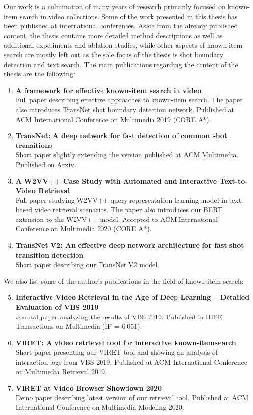 Our work is a culmination of many years of research primarily focused on known-item search in video collections. Some of the work presented in this thesis has been published at international conferences. Aside from the already published content, the thesis contains more detailed method descriptions as well as additional experiments and ablation studies, while other aspects of known-item search are mostly left out as the sole focus of the thesis is shot boundary detection and text search. The main publications regarding the content of the thesis are the following:
\begin{enumerate}
	\item \textbf{A framework for effective known-item search in video}~\cite{LokocMM2019}\\
	Full paper describing effective approaches to known-item search. The paper also introduces TransNet shot boundary detection network. Published at ACM International Conference on Multimedia 2019 (CORE A*).
	\item \textbf{TransNet: A deep network for fast detection of common shot transitions}~\cite{soucek2019transnet}\\
	Short paper slightly extending the version published at ACM Multimedia. Published on Arxiv.
	\item \textbf{A W2VV++ Case Study with Automated and Interactive Text-to-Video Retrieval}~\cite{W2VVppMM2020}\\
	Full paper studying W2VV++ query representation learning model \cite{XirongW2VVpp} in text-based video retrieval scenarios. The paper also introduces our BERT extension to the W2VV++ model. Accepted to ACM International Conference on Multimedia 2020 (CORE A*).
	\item \textbf{TransNet V2: An effective deep network architecture for fast shot transition detection}~\cite{soucek2020transnetv2}\\
	Short paper describing our TransNet V2 model.%
\end{enumerate}
We also list some of the author's publications in the field of known-item search:
\begin{enumerate}\setcounter{enumi}{4}
	\item \textbf{Interactive Video Retrieval in the Age of Deep Learning -- Detailed Evaluation of VBS 2019}~\cite{VBS2019_overview}\\
	Journal paper analyzing the results of VBS 2019. Published in IEEE Transactions on Multimedia (IF = 6.051).
	\item \textbf{VIRET: A video retrieval tool for interactive known-item\linebreak[4] search}~\cite{LokocICMR2019}\\
	Short paper presenting our VIRET tool and showing an analysis of interaction logs from VBS 2019. Published at ACM International Conference on Multimedia Retrieval 2019.
	\item \textbf{VIRET at Video Browser Showdown 2020}~\cite{LokocVBS2020_VIRET}\\
	Demo paper describing latest version of our retrieval tool. Published at ACM International Conference on Multimedia Modeling 2020.
\end{enumerate}
